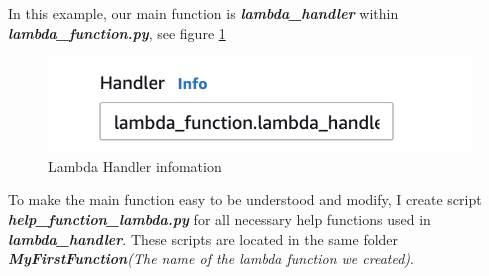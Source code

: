 \documentclass[12pt]{article}
\begin{document}
In this example, our main function is \textbf{\textit{lambda\_handler}} within \textbf{\textit{lambda\_function.py}}, see figure \ref{fig:handler_info}
\begin{figure}[H]
\centering
\begin{minipage}{.4\textwidth}
  \centering
  \includegraphics[width=1\linewidth]{handler_info.png}
   \caption{Lambda Handler infomation}
   \label{fig:handler_info}
\end{minipage}%
\end{figure}

To make the main function easy to be understood and modify, I create script \textbf{\textit{help\_function\_lambda.py}} for all necessary help functions used in \textbf{\textit{lambda\_handler}}. These scripts are located in the same folder \textbf{\textit{MyFirstFunction}}\textit{(The name of the lambda function we created)}.
\end{document}
